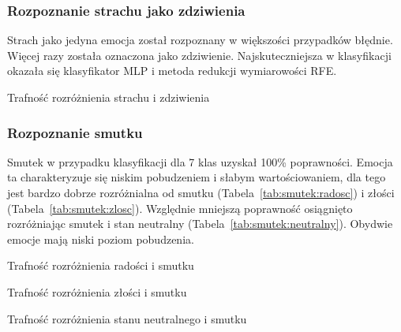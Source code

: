\documentclass[a4paper,12pt,twoside,openany]{report}
\newcommand{\Tab}[1]{(Tabela~\ref{#1})}
\begin{document}
\subsubsection{Rozpoznanie strachu jako zdziwienia}
Strach jako jedyna emocja został rozpoznany w większości przypadków błędnie.
Więcej razy została oznaczona jako zdziwienie.
Najskuteczniejsza w klasyfikacji okazała się klasyfikator MLP i metoda redukcji wymiarowości RFE.
\begin{table}[hc!]
	\centering
	
	\caption{Trafność rozróżnienia strachu i zdziwienia}
\end{table}

\subsubsection{Rozpoznanie smutku}
Smutek w przypadku klasyfikacji dla 7 klas uzyskał 100\% poprawności. 
Emocja ta charakteryzuje się niskim pobudzeniem i słabym wartościowaniem,
dla tego jest bardzo dobrze rozróżnialna od smutku \Tab{tab:smutek:radosc} i złości \Tab{tab:smutek:zlosc}.
Względnie mniejszą poprawność osiągnięto rozróżniając smutek i stan neutralny \Tab{tab:smutek:neutralny}.
Obydwie emocje mają niski poziom pobudzenia.
\begin{table}[hc!]
	\centering
	
	\caption{Trafność rozróżnienia radości i smutku}
	\label{tab:smutek:radosc}
\end{table}
\begin{table}[hc!]
	\centering
	
	\caption{Trafność rozróżnienia złości i smutku}
	\label{tab:smutek:zlosc}
\end{table}
\begin{table}[hc!]
	\centering
	
	\caption{Trafność rozróżnienia stanu neutralnego i smutku}
	\label{tab:smutek:neutralny}
\end{table}
\end{document}
